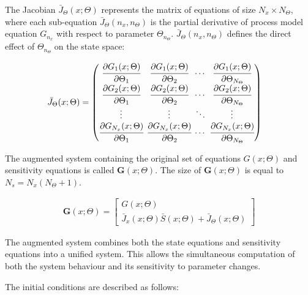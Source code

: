\documentclass[a4paper,fleqn]{cas-dc}
\begin{document}
	The Jacobian ${\bar{J}_\Theta}(x;\Theta)$ represents the matrix of equations of size $N_x \times N_\Theta$, where each sub-equation ${\bar{J}_\Theta}(n_x,n_\Theta)$ is the partial derivative of process model equation $G_{n_x}$ with respect to parameter $\Theta_{n_\Theta}$. ${\bar{J}_\Theta}(n_x,n_\Theta)$ defines the direct effect of $\Theta_{n_\Theta}$ on the state space:
	
	{\footnotesize
		\begin{align}
			{\bar{J}_\Theta}(x;\Theta) & =
			\begingroup %
			\setlength\arraycolsep{2pt}
			\begin{pmatrix}
				\cfrac{\partial {G_{1}}(x;\Theta)}{\partial {\Theta_{1}}} & \cfrac{\partial {G_{1}}(x;\Theta)}{\partial {\Theta_{2}}} & \cdots & \cfrac{\partial {G_{1}}(x;\Theta)}{\partial {\Theta_{N_\Theta}}}\\
				\cfrac{\partial {G_{2}}(x;\Theta)}{\partial {\Theta_{1}}} & \cfrac{\partial {G_{2}}(x;\Theta)}{\partial {\Theta_{2}}} & \cdots & \cfrac{\partial {G_{2}}(x;\Theta)}{\partial {\Theta_{N_\Theta}}}\\
				\vdots & \vdots & \ddots & \vdots\\
				\cfrac{\partial {G_{N_x}}(x;\Theta)}{\partial {\Theta_{1}}} & \cfrac{\partial {G_{N_x}}(x;\Theta)}{\partial {\Theta_{2}}} & \cdots & \cfrac{\partial {G_{N_x}}(x;\Theta)}{\partial {\Theta_{N_\Theta}}}
			\end{pmatrix}
			\endgroup
	\end{align}}
	
	The augmented system containing the original set of equations $G(x;\Theta)$ and sensitivity equations is called ${\textbf{G}}\left(x;\Theta\right)$. The size of ${\textbf{G}}\left(x;\Theta\right)$ is equal to $N_s = N_x(N_\Theta + 1)$.
	
	{\footnotesize
		\begin{align}
			{\textbf{G}}\left(x;\Theta\right) = 
			\begin{bmatrix}
				G(x;\Theta)\\
				{\bar{J}_x}(x;\Theta)\bar{S}(x;\Theta) + {\bar{J}_\Theta}(x;\Theta)
			\end{bmatrix}
	\end{align} }

	The augmented system combines both the state equations and sensitivity equations into a unified system. This allows the simultaneous computation of both the system behaviour and its sensitivity to parameter changes.
	
	The initial conditions are described as follows:
	
\end{document}
